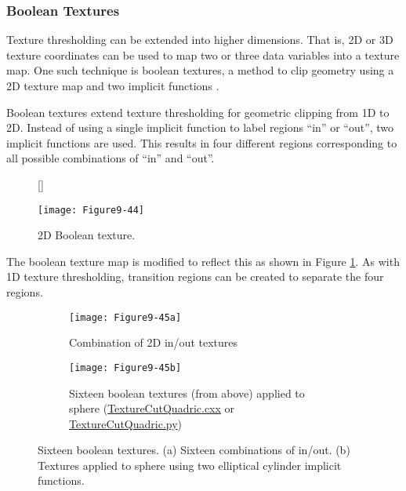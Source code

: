 \subsubsection{Boolean Textures}

Texture thresholding can be extended into higher dimensions. That is, 2D or 3D texture coordinates can be used to map two or three data variables into a texture map. One such technique is boolean textures, a method to clip geometry using a 2D texture map and two implicit functions \cite{Lorensen93}.

Boolean textures extend texture thresholding for geometric clipping from 1D to 2D. Instead of using a single implicit function to label regions ``in'' or ``out'', two implicit functions are used. This results in four different regions corresponding to all possible combinations of ``in'' and ``out''.

\begin{figure}[!htb]
	[\FBwidth]
	{\caption{2D Boolean texture.}\label{fig:Figure9-44}}
	{\texttt{[image: Figure9-44]}}
\end{figure}

The boolean texture map is modified to reflect this as shown in Figure  \ref{fig:Figure9-44}. As with 1D texture thresholding, transition regions can be created to separate the four regions.

\begin{figure}[htb]
	\begin{subfigure}[h]{0.75\linewidth}
		\texttt{[image: Figure9-45a]}
		\captionsetup{justification=centering}
		\caption{Combination of 2D in/out textures}
		\label{fig:Figure9-45a}
	\end{subfigure}
	\hfill
	\begin{subfigure}[h]{0.75\linewidth}
		\texttt{[image: Figure9-45b]}
		\captionsetup{justification=centering}
		\caption{Sixteen boolean textures (from above) applied to sphere  (\href{https://lorensen.github.io/VTKExamples/site/Cxx/Texture/TextureCutQuadric/}{TextureCutQuadric.cxx} or \href{https://lorensen.github.io/VTKExamples/site/Python/Texture/TextureCutQuadric/}{TextureCutQuadric.py})}
		\label{fig:Figure9-45b}
	\end{subfigure}
	\caption{Sixteen boolean textures. (a) Sixteen combinations of in/out. (b) Textures applied to sphere using two elliptical cylinder implicit functions.}\label{fig:Figure9-45}
\end{figure}

